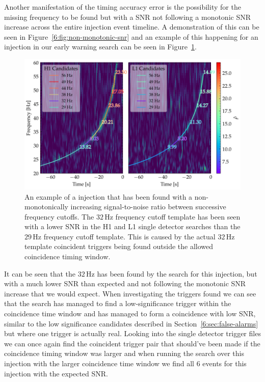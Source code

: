 Another manifestation of the timing accuracy error is the possibility for the missing frequency to be found but with a SNR not following a monotonic SNR increase across the entire injection event timeline. A demonstration of this can be seen in Figure~\ref{6:fig:non-monotonic-snr} and an example of this happening for an injection in our early warning search can be seen in Figure~\ref{6:fig:non_mono_eg}.
%
\begin{figure}
    \centering
    \includegraphics[width=1.0\linewidth]{images/6_earlywarning/stories/non_mono_example.pdf}
    \caption{An example of a \gwadj injection that has been found with a non-monotonically increasing signal-to-noise ratio between successive frequency cutoffs. The $32 \, \text{Hz}$ frequency cutoff \gwadj template has been seen with a lower SNR in the H1 and L1 single detector searches than the $29 \, \text{Hz}$ frequency cutoff template. This is caused by the actual $32 \, \text{Hz}$ template coincident triggers being found outside the allowed coincidence timing window.}
    \label{6:fig:non_mono_eg}
\end{figure}

It can be seen that the $32 \, \text{Hz}$ has been found by the search for this injection, but with a much lower SNR than expected and not following the monotonic SNR increase that we would expect. When investigating the triggers found we can see that the search has managed to find a low-significance trigger within the coincidence time window and has managed to form a coincidence with low SNR, similar to the low significance candidates described in Section~\ref{6:sec:false-alarms} but where one trigger is actually real. Looking into the single detector trigger files we can once again find the coincident trigger pair that should've been made if the coincidence timing window was larger and when running the search over this injection with the larger coincidence time window we find all $6$ events for this injection with the expected SNR.

